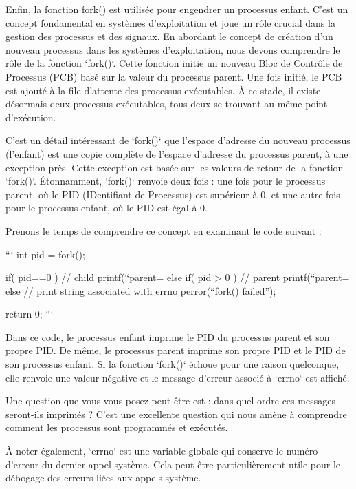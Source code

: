 \documentclass[12pt]{article}
\begin{document}
Enfin, la fonction fork() est utilisée pour engendrer un processus enfant. C'est un concept fondamental en systèmes d'exploitation et joue un rôle crucial dans la gestion des processus et des signaux.
En abordant le concept de création d'un nouveau processus dans les systèmes d'exploitation, nous devons comprendre le rôle de la fonction `fork()`. Cette fonction initie un nouveau Bloc de Contrôle de Processus (PCB) basé sur la valeur du processus parent. Une fois initié, le PCB est ajouté à la file d'attente des processus exécutables. À ce stade, il existe désormais deux processus exécutables, tous deux se trouvant au même point d'exécution.

C'est un détail intéressant de `fork()` que l'espace d'adresse du nouveau processus (l'enfant) est une copie complète de l'espace d'adresse du processus parent, à une exception près. Cette exception est basée sur les valeurs de retour de la fonction `fork()`. Étonnamment, `fork()` renvoie deux fois : une fois pour le processus parent, où le PID (IDentifiant de Processus) est supérieur à 0, et une autre fois pour le processus enfant, où le PID est égal à 0.

Prenons le temps de comprendre ce concept en examinant le code suivant :

```
int pid = fork();   

if( pid==0 ) {
    // child       
    printf(“parent=%
}   
else if( pid > 0 ) {
    // parent       
    printf(“parent=%
}   
else {
    // print string associated with errno          
    perror(“fork() failed”);    
}

return 0;
```

Dans ce code, le processus enfant imprime le PID du processus parent et son propre PID. De même, le processus parent imprime son propre PID et le PID de son processus enfant. Si la fonction `fork()` échoue pour une raison quelconque, elle renvoie une valeur négative et le message d'erreur associé à `errno` est affiché.

Une question que vous vous posez peut-être est : dans quel ordre ces messages seront-ils imprimés ? C'est une excellente question qui nous amène à comprendre comment les processus sont programmés et exécutés.

À noter également, `errno` est une variable globale qui conserve le numéro d'erreur du dernier appel système. Cela peut être particulièrement utile pour le débogage des erreurs liées aux appels système.
\end{document}
